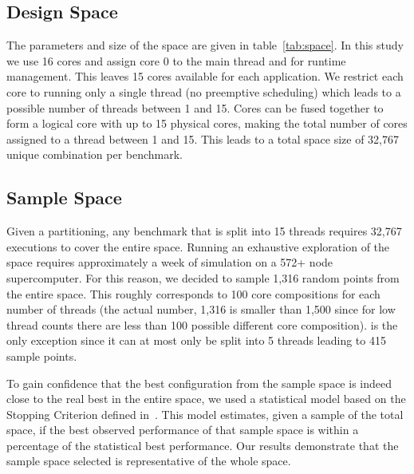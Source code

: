\vspace{2mm}

\subsection{Design Space}

The parameters and size of the space are given in table~\ref{tab:space}.
In this study we use 16 cores and assign core 0 to the main thread and for runtime management. This leaves 15 cores available for each application.
We restrict each core to running only a single thread (no preemptive scheduling) which leads to a possible number of threads between 1 and 15.
Cores can be fused together to form a logical core with up to 15 physical cores, making the total number of cores assigned to a thread between 1 and 15.
This leads to a total space size of 32,767 unique combination per benchmark.

\vspace{2mm}
\subsection{Sample Space}

Given a partitioning, any benchmark that is split into 15 threads requires 32,767 executions to cover the entire space.
Running an exhaustive exploration of the space requires approximately a week of simulation on a 572+ node supercomputer.
For this reason, we decided to sample 1,316 random points from the entire space.
This roughly corresponds to 100 core compositions for each number of threads (the actual number, 1,316 is smaller than 1,500 since for low thread counts there are less than 100 possible different core composition).
 is the only exception since it can at most only be split into 5 threads leading to 415 sample points.

To gain confidence that the best configuration from the sample space is indeed close to the real best in the entire space, we used a statistical model based on the Stopping Criterion defined in~\cite{vuduc2003AutomaticPerf}.
This model estimates, given a sample of the total space, if the best observed performance of that sample space is within a percentage of the statistical best performance.
Our results demonstrate that the sample space selected is representative of the whole space.

